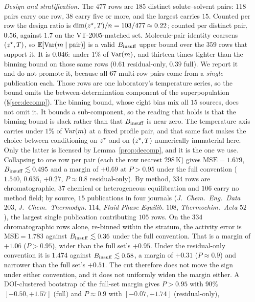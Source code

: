 \emph{Design and stratification.} The $477$ rows are $185$ distinct solute--solvent pairs: $118$
pairs carry one row, $38$ carry five or more, and the largest carries $15$. Counted per row the
design ratio is $\dim(z^\star,T)/n=103/477\approx0.22$; counted per distinct pair, $0.56$, against
$1.7$ on the VT-2005-matched set. Molecule-pair identity coarsens $(z^\star,T)$, so $\mathbb{E}[\mathrm{Var}(m\mid\text{pair})]$ is a valid
$B_{\mathrm{insuff}}$ upper bound over the $359$ rows that support it. It is $0.046$: under $1\%$ of $\mathrm{Var}(m)$,
and thirteen times tighter than the binning bound on those same rows ($0.61$ residual-only, $0.39$
full). We report it and do not promote it, because all $67$ multi-row pairs come from a \emph{single}
publication each. Those rows are one laboratory's temperature series, so the bound omits the
between-determination component of the superpopulation (\S\ref{sec:decomp}). The binning bound,
whose eight bins mix all $15$ sources, does not omit it. It bounds a sub-component, so the reading
that holds is that the binning bound is slack rather than that $B_{\mathrm{insuff}}$ is near zero. The temperature axis carries under $1\%$ of $\mathrm{Var}(m)$ at a fixed profile pair, and that same fact
makes the choice between conditioning on $z^\star$ and on $(z^\star,T)$ numerically immaterial here.
Only the latter is licensed by Lemma~\ref{prop:decomp}, and it is the one we use. Collapsing to one
row per pair (each the row nearest $298$\,K) gives $\mathrm{MSE}=1.679$, $B_{\mathrm{insuff}}\lesssim0.495$ and a
margin of $+0.69$ at $P>0.95$ under the full convention ($1.540$, $0.635$, $+0.27$, $P\approx0.8$
residual-only). By method, $334$ rows are chromatographic, $37$ chemical or heterogeneous
equilibration and $106$ carry no method field; by source, $15$ publications in four journals
(\emph{J.\ Chem.\ Eng.\ Data} $203$, \emph{J.\ Chem.\ Thermodyn.} $114$, \emph{Fluid Phase Equilib.}
$108$, \emph{Thermochim.\ Acta} $52$), the largest single publication contributing $105$ rows. On the $334$ chromatographic rows alone, re-binned within the stratum, the activity error is
$\mathrm{MSE}=1.783$ against $B_{\mathrm{insuff}}\lesssim0.36$ under the full convention. That is a margin of
$+1.06$ ($P>0.95$), wider than the full set's $+0.95$. Under the residual-only convention it is
$1.474$ against $B_{\mathrm{insuff}}\lesssim0.58$, a margin of $+0.31$ ($P\approx0.9$) and narrower than the
full set's $+0.51$. The cut
therefore does not move the sign under either convention, and it does not uniformly widen the margin
either. A DOI-clustered bootstrap of the full-set margin
gives $P>0.95$ with $90\%$ $[+0.50,+1.57]$ (full) and $P\approx0.9$ with $[-0.07,+1.74]$ (residual-only),
